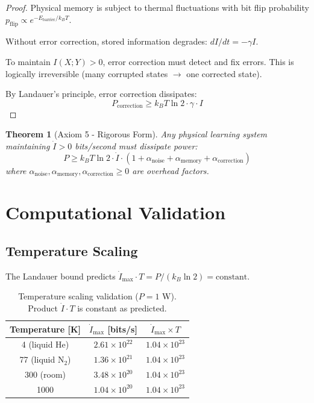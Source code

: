 \documentclass{article}
\newtheorem{theorem}{Theorem}[section]
\begin{document}
\begin{proof}
Physical memory is subject to thermal fluctuations with bit flip probability $p_{\text{flip}} \propto e^{-E_{\text{barrier}}/k_B T}$.

Without error correction, stored information degrades: $dI/dt = -\gamma I$.

To maintain $I(X; Y) > 0$, error correction must detect and fix errors. This is logically irreversible (many corrupted states $\to$ one corrected state).

By Landauer's principle, error correction dissipates:
\begin{equation}
P_{\text{correction}} \geq k_B T \ln 2 \cdot \gamma \cdot I
\end{equation}
\end{proof}

\begin{theorem}[Axiom 5 - Rigorous Form]
Any physical learning system maintaining $\dot{I} > 0$ bits/second must dissipate power:
\begin{equation}
P \geq k_B T \ln 2 \cdot \dot{I} \cdot (1 + \alpha_{\text{noise}} + \alpha_{\text{memory}} + \alpha_{\text{correction}})
\end{equation}
where $\alpha_{\text{noise}}, \alpha_{\text{memory}}, \alpha_{\text{correction}} \geq 0$ are overhead factors.
\end{theorem}

\section{Computational Validation}

\subsection{Temperature Scaling}

The Landauer bound predicts $\dot{I}_{\max} \cdot T = P / (k_B \ln 2) = \text{constant}$.

\begin{table}[h]
\centering
\begin{tabular}{@{}ccc@{}}
\toprule
Temperature [K] & $\dot{I}_{\max}$ [bits/s] & $\dot{I}_{\max} \times T$ \\
\midrule
4 (liquid He) & $2.61 \times 10^{22}$ & $1.04 \times 10^{23}$ \\
77 (liquid N$_2$) & $1.36 \times 10^{21}$ & $1.04 \times 10^{23}$ \\
300 (room) & $3.48 \times 10^{20}$ & $1.04 \times 10^{23}$ \\
1000 & $1.04 \times 10^{20}$ & $1.04 \times 10^{23}$ \\
\bottomrule
\end{tabular}
\caption{Temperature scaling validation ($P = 1$ W). Product $\dot{I} \cdot T$ is constant as predicted.}
\label{tab:temp}
\end{table}
\end{document}

